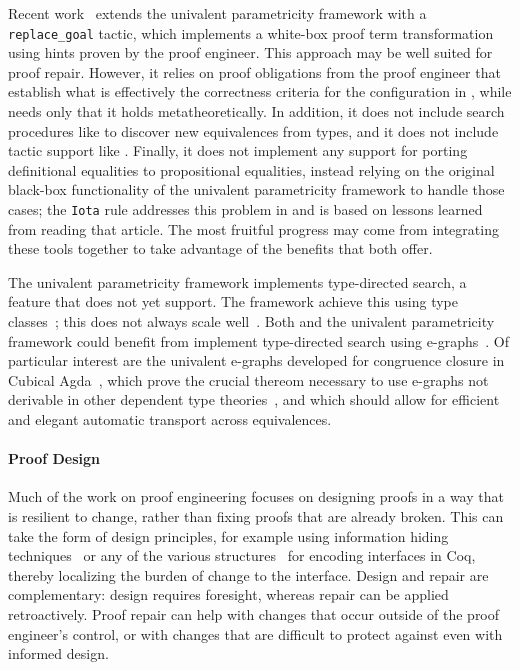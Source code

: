 Recent work~\cite{tabareau2019marriage} extends the univalent parametricity framework with a \lstinline{replace_goal} tactic,
which implements a white-box proof term transformation using hints proven by the proof engineer.
This approach may be well suited for proof repair.
However, it relies on proof obligations from the proof engineer that establish what is effectively the correctness criteria
for the configuration in \toolname, while \toolname needs only that it holds metatheoretically.
In addition, it does not include search procedures like \toolname to discover new equivalences from types,
and it does not include tactic support like \toolname.
Finally, it does not implement any support for porting definitional equalities to propositional equalities,
instead relying on the original black-box functionality of the univalent parametricity framework to handle those cases;
the \lstinline{Iota} rule addresses this problem in \toolname and is based on lessons learned from reading that article.
The most fruitful progress may come from integrating these tools together to take advantage of the benefits that both offer.

The univalent parametricity framework implements type-directed search, a feature that \toolname does not yet support.
The framework achieve this using type classes~\cite{Sozeau2008}; this does not always scale well~\cite{tabareau2019marriage}.
Both \toolname and the univalent parametricity framework could benefit from implement type-directed search using e-graphs~\cite{egraph1}.
Of particular interest are the univalent e-graphs developed for congruence closure in Cubical Agda~\cite{egraph6},
which prove the crucial thereom necessary to use e-graphs not derivable in other dependent type theories~\cite{egraph7},
and which should allow for efficient and elegant automatic transport across equivalences.

\paragraph{Proof Design}

Much of the work on proof engineering focuses on designing proofs
in a way that is resilient to change, rather than fixing proofs that are already broken.
This can take the form of design principles, for example using 
information hiding techniques~\cite{Woos:2016:PCF:2854065.2854081, Klein:2014:CFV:2584468.2560537}
or any of the various structures~\cite{Chrzaszcz2003, Sozeau2008, Saibi:PhD} for encoding interfaces in Coq,
thereby localizing the burden of change to the interface.
Design and repair are complementary: design requires foresight, whereas repair can be applied retroactively.
Proof repair can help with changes that occur outside of the proof engineer's control,
or with changes that are difficult to protect against even with informed design.

